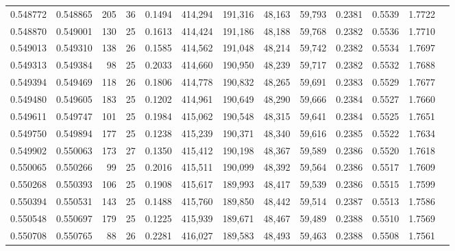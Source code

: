 \begin{tabular}{rrrrrrrrrrrrr}
0.548772 & 0.548865 &   205 &  36 &                                     0.1494 & 414,294 & 191,316 &  48,163 &  59,793 & 0.2381 & 0.5539 & 1.7722 \\
0.548870 & 0.549001 &   130 &  25 &                                     0.1613 & 414,424 & 191,186 &  48,188 &  59,768 & 0.2382 & 0.5536 & 1.7710 \\
0.549013 & 0.549310 &   138 &  26 &                                     0.1585 & 414,562 & 191,048 &  48,214 &  59,742 & 0.2382 & 0.5534 & 1.7697 \\
0.549313 & 0.549384 &    98 &  25 &                                     0.2033 & 414,660 & 190,950 &  48,239 &  59,717 & 0.2382 & 0.5532 & 1.7688 \\
0.549394 & 0.549469 &   118 &  26 &                                     0.1806 & 414,778 & 190,832 &  48,265 &  59,691 & 0.2383 & 0.5529 & 1.7677 \\
0.549480 & 0.549605 &   183 &  25 &                                     0.1202 & 414,961 & 190,649 &  48,290 &  59,666 & 0.2384 & 0.5527 & 1.7660 \\
0.549611 & 0.549747 &   101 &  25 &                                     0.1984 & 415,062 & 190,548 &  48,315 &  59,641 & 0.2384 & 0.5525 & 1.7651 \\
0.549750 & 0.549894 &   177 &  25 &                                     0.1238 & 415,239 & 190,371 &  48,340 &  59,616 & 0.2385 & 0.5522 & 1.7634 \\
0.549902 & 0.550063 &   173 &  27 &                                     0.1350 & 415,412 & 190,198 &  48,367 &  59,589 & 0.2386 & 0.5520 & 1.7618 \\
0.550065 & 0.550266 &    99 &  25 &                                     0.2016 & 415,511 & 190,099 &  48,392 &  59,564 & 0.2386 & 0.5517 & 1.7609 \\
0.550268 & 0.550393 &   106 &  25 &                                     0.1908 & 415,617 & 189,993 &  48,417 &  59,539 & 0.2386 & 0.5515 & 1.7599 \\
0.550394 & 0.550531 &   143 &  25 &                                     0.1488 & 415,760 & 189,850 &  48,442 &  59,514 & 0.2387 & 0.5513 & 1.7586 \\
0.550548 & 0.550697 &   179 &  25 &                                     0.1225 & 415,939 & 189,671 &  48,467 &  59,489 & 0.2388 & 0.5510 & 1.7569 \\
0.550708 & 0.550765 &    88 &  26 &                                     0.2281 & 416,027 & 189,583 &  48,493 &  59,463 & 0.2388 & 0.5508 & 1.7561 \\

\end{tabular}
